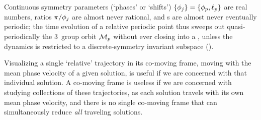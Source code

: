 Continuous symmetry parameters (`phases' or `shifts')
$\{{\bf \phi}_j\}=\{\phi_p,\ell_p\}$ are real numbers, ratios
$\pi/{\bf \phi}_j$ are almost never rational, and \rpo s are almost never
eventually periodic; the time evolution of a relative periodic point thus
sweeps out quasi-periodically the $3$\dmn\ group orbit ${\cal M}_p$ without
ever closing into a \po, unless the dynamics is restricted to a
discrete-symmetry invariant subspace ().

Visualizing a single `relative' trajectory in its co-moving frame, moving with
the mean phase velocity of a given solution, is useful if we are
concerned with that individual solution. A co-moving frame is useless if
we are concerned with studying collections of these trajectories, as each
solution travels with its own mean phase velocity, and there is no single
co-moving frame that can simultaneously reduce \emph{all} traveling
solutions.
